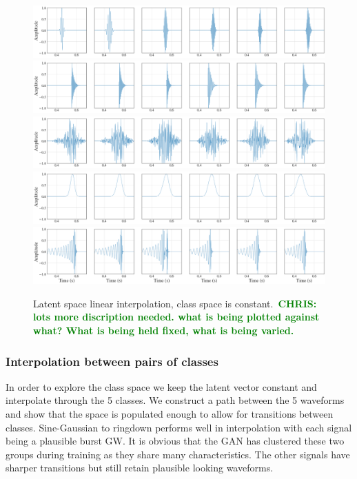 \documentclass[12pt]{iopart}
\newcommand{\chris}[1]{\textbf{\textcolor{green}{CHRIS: #1}}}
\begin{document}
\begin{figure}
    \centering
    \includegraphics[width=\textwidth]{figures/generations/z_interp_sg.png}
    \includegraphics[width=\textwidth]{figures/generations/z_interp_rd.png}
    \includegraphics[width=\textwidth]{figures/generations/z_interp_wnb.png}
    \includegraphics[width=\textwidth]{figures/generations/z_interp_blip.png}
    \includegraphics[width=\textwidth]{figures/generations/z_interp_bbh.png}
    \caption{Latent space linear interpolation, class space is
constant.~\chris{lots more discription needed. what is being plotted against
what? What is being held fixed, what is being varied.}}
    \label{fig:z_interp}
\end{figure}

\subsubsection{Interpolation between pairs of classes}

In order to explore the class space we keep the latent vector constant and
interpolate through the 5 classes. We construct a path between the 5 waveforms
and show that the space is populated enough to allow for transitions between
classes. Sine-Gaussian to ringdown performs well in interpolation with each
signal being a plausible burst GW. It is obvious that the GAN has clustered
these two groups during training as they share many characteristics. The other
signals have sharper transitions but still retain plausible looking waveforms. 
\end{document}
